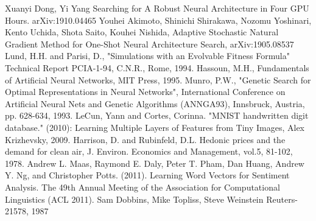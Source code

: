 \documentclass[conference]{IEEEtran}
\begin{document}
\begin{thebibliography}{00}
 Xuanyi Dong, Yi Yang Searching for A Robust Neural Architecture in Four GPU Hours. arXiv:1910.04465
 Youhei Akimoto, Shinichi Shirakawa, Nozomu Yoshinari, Kento Uchida, Shota Saito, Kouhei Nishida, Adaptive Stochastic Natural Gradient Method for One-Shot Neural Architecture Search, arXiv:1905.08537
 Lund, H.H. and Parisi, D., "Simulations with an Evolvable Fitness Formula" Technical Report PCIA-1-94, C.N.R., Rome, 1994.
 Hassoun, M.H., Fundamentals of Artificial Neural Networks, MIT Press, 1995.
 Munro, P.W., "Genetic Search for Optimal Representations in Neural Networks", International Conference on Artificial Neural Nets and Genetic Algorithms (ANNGA93), Innsbruck, Austria, pp. 628-634, 1993.
 LeCun, Yann and Cortes, Corinna. "MNIST handwritten digit database." (2010): 
 Learning Multiple Layers of Features from Tiny Images, Alex Krizhevsky, 2009.
 Harrison, D. and Rubinfeld, D.L. Hedonic prices and the demand for clean air, J. Environ. Economics and Management, vol.5, 81-102, 1978. 
 Andrew L. Maas, Raymond E. Daly, Peter T. Pham, Dan Huang, Andrew Y. Ng, and Christopher Potts. (2011). Learning Word Vectors for Sentiment Analysis. The 49th Annual Meeting of the Association for Computational Linguistics (ACL 2011).
 Sam Dobbins, Mike Topliss, Steve Weinstein Reuters-21578, 1987
\end{thebibliography}
\end{document}
